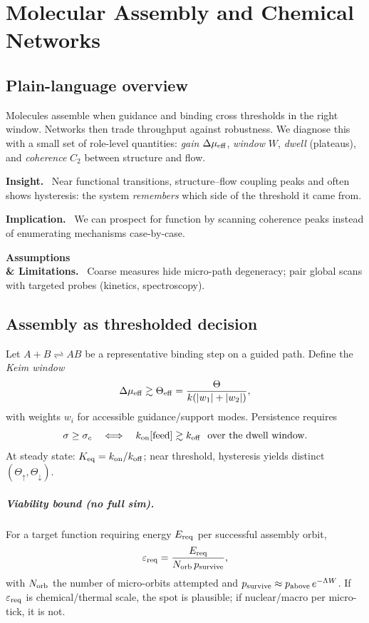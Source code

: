\documentclass[12pt,a4paper,oneside]{scrreprt}
\newenvironment{insight}{\par\vspace{0.5em}\noindent\textbf{Insight.}\ }{\par\vspace{0.5em}}
\newenvironment{implication}{\par\vspace{0.5em}\noindent\textbf{Implication.}\ }{\par\vspace{0.5em}}
\newenvironment{limitation}{\par\vspace{0.5em}\noindent\textbf{Assumptions \\ \& Limitations.}\ }{\par\vspace{0.5em}}
\begin{document}
\chapter{Molecular Assembly and Chemical Networks}\label{ch:molecular-networks}

\section*{Plain-language overview}
Molecules assemble when guidance and binding cross thresholds in the right window. Networks then trade throughput against robustness. We diagnose this with a small set of role-level quantities: \emph{gain} $\Delta\mu_{\rm eff}$, \emph{window} $W$, \emph{dwell} (plateaus), and \emph{coherence} $C_2$ between structure and flow.

\begin{insight}
Near functional transitions, structure–flow coupling peaks and often shows hysteresis: the system \emph{remembers} which side of the threshold it came from.
\end{insight}

\begin{implication}
We can prospect for function by scanning coherence peaks instead of enumerating mechanisms case-by-case.
\end{implication}

\begin{limitation}
Coarse measures hide micro-path degeneracy; pair global scans with targeted probes (kinetics, spectroscopy).
\end{limitation}

\section{Assembly as thresholded decision}\label{sec:assembly-threshold}
Let $A+B \rightleftharpoons AB$ be a representative binding step on a guided path.
Define the \emph{Keim window}
\[
\Delta\mu_{\rm eff}\gtrsim \Theta_{\rm eff}=\frac{\Theta}{k(|w_1|+|w_2|)},
\]
with weights $w_i$ for accessible guidance/support modes. Persistence requires
\[
\sigma\ge\sigma_c \quad\Longleftrightarrow\quad k_{\rm on}[\text{feed}] \gtrsim k_{\rm off} \ \ \text{over the dwell window}.
\]
At steady state: $K_{\rm eq}=k_{\rm on}/k_{\rm off}$; near threshold, hysteresis yields distinct $(\Theta_\uparrow,\Theta_\downarrow)$.

\paragraph{Viability bound (no full sim).}
For a target function requiring energy $E_{\rm req}$ per successful assembly orbit,
\[
\varepsilon_{\rm req}=\frac{E_{\rm req}}{N_{\rm orb} \, p_{\rm survive}},
\]
with $N_{\rm orb}$ the number of micro-orbits attempted and $p_{\rm survive}\approx p_{\rm above}\,e^{-\Lambda W}$.
If $\varepsilon_{\rm req}$ is chemical/thermal scale, the spot is plausible; if nuclear/macro per micro-tick, it is not.
\end{document}
